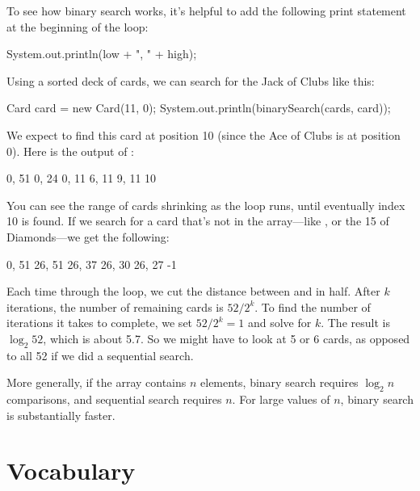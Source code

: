 
To see how binary search works, it's helpful to add the following print statement at the beginning of the loop:

\begin{code}
System.out.println(low + ", " + high);
\end{code}

Using a sorted deck of cards, we can search for the Jack of Clubs like this:

\begin{code}
Card card = new Card(11, 0);
System.out.println(binarySearch(cards, card));
\end{code}

We expect to find this card at position 10 (since the Ace of Clubs is at position 0).
Here is the output of :

\begin{stdout}
0, 51
0, 24
0, 11
6, 11
9, 11
10
\end{stdout}

You can see the range of cards shrinking as the  loop runs, until eventually index 10 is found.
If we search for a card that's not in the array---like , or the 15 of Diamonds---we get the following:

\begin{stdout}
0, 51
26, 51
26, 37
26, 30
26, 27
-1
\end{stdout}

%

Each time through the loop, we cut the distance between  and  in half.
After $k$ iterations, the number of remaining cards is $52 / 2^k$.
To find the number of iterations it takes to complete, we set $52 / 2^k = 1$ and solve for $k$.
The result is $\log_2 52$, which is about 5.7.
So we might have to look at 5 or 6 cards, as opposed to all 52 if we did a sequential search.

More generally, if the array contains $n$ elements, binary search requires $\log_2 n$ comparisons, and sequential search requires $n$.
For large values of $n$, binary search is substantially faster.


\section{Vocabulary}

